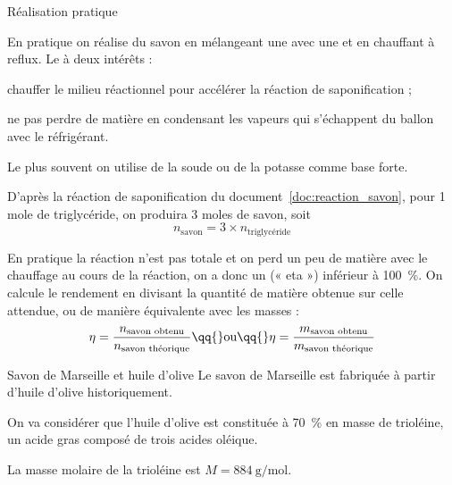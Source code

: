 \begin{doc}{Réalisation pratique}
  \begin{wrapfigure}{r}{0.4\linewidth}
    \centering
    \vspace*{-32pt}
  \end{wrapfigure}
  En pratique on réalise du savon en mélangeant une  avec une  et en chauffant à reflux.
  Le  à deux intérêts :
  \begin{listePoints}
    \item chauffer le milieu réactionnel pour accélérer la réaction de saponification ;
    \item ne pas perdre de matière en condensant les vapeurs qui s'échappent du ballon avec le réfrigérant.
  \end{listePoints}

  Le plus souvent on utilise de la soude  ou de la potasse  comme base forte.

  D'après la réaction de saponification du document~\ref{doc:reaction_savon}, pour 1 mole de triglycéride, on produira 3 moles de savon, soit
  \begin{equation*}
    n_\text{savon} = 3\times n_\text{triglycéride}
  \end{equation*}

  En pratique la réaction n'est pas totale et on perd un peu de matière avec le chauffage au cours de la réaction, on a donc un  (« eta »)  inférieur à \qty{100}{\percent}.
  On calcule le rendement en divisant la quantité de matière obtenue sur celle attendue, ou de manière équivalente avec les masses :
  \begin{equation*}
    \eta = \dfrac{n_\text{savon obtenu}}{n_\text{savon théorique}}
    \qq{} \text{ou} \qq{}
    \eta = \dfrac{m_\text{savon obtenu}}{m_\text{savon théorique}}
  \end{equation*}
\end{doc}

\begin{doc}{Savon de Marseille et huile d'olive}
  Le savon de Marseille est fabriquée à partir d'huile d'olive historiquement.
  
  On va considérer que l'huile d'olive est constituée à \qty{70}{\percent} en masse de trioléine, un acide gras composé de trois acides oléique.

  La masse molaire de la trioléine est $M = \qty{884}{\g\per\mole}$.
\end{doc}

